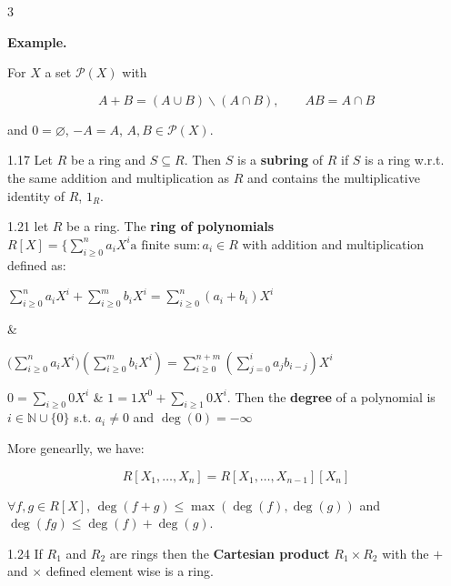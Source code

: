 \documentclass[8pt]{extarticle}
\newenvironment{example}{%
  \par\noindent
  \textbf{Example.}\ \normalfont
  \ignorespaces
}{%
  \par
}
\begin{document}
\begin{multicols}{3}
        \begin{example}
            For \(X\) a set \(\mathcal{P}(X)\) with
            
            \vspace{-15pt}
            \[A+B=(A\cup B)\backslash(A\cap B),\qquad AB=A\cap B\]
            \vspace{-15pt}

            and \(0=\varnothing\), \(-A=A\), \(A,B\in\mathcal{P}(X)\).
        \end{example}

        \begin{definition}{1.17}
            Let \(R\) be a ring and \(S\subseteq R\). Then \(S\) is a \textbf{subring} of \(R\) if \(S\) is a ring w.r.t. the same addition and multiplication as \(R\) and contains the multiplicative identity of \(R\), \(1_R\).
        \end{definition}

        \begin{definition}{1.21}
            let \(R\) be a ring. The \textbf{ring of polynomials} \(R[X]=\{\sum_{i\ge0}^na_iX^i\text{a finite sum}:a_i\in R\) with addition and multiplication defined as:
            
            \(\sum_{i\ge0}^na_iX^i+\sum_{i\ge0}^mb_iX^i=\sum_{i\ge0}^n(a_i+b_i)X^i\)
            
            \&
            
            \(\big(\sum\limits_{i\ge0}^na_iX^i)(\sum\limits_{i\ge0}^mb_iX^i)=\sum\limits_{i\ge0}^{n+m}(\sum\limits_{j=0}^ia_{j}b_{i-j})X^i\)
            
            \(0=\sum_{i\ge0}0X^i\) \& \(1=1X^0+\sum_{i\ge1}0X^i\). Then the \textbf{degree} of a polynomial is \(i\in\mathbb{N}\cup\{0\}\) s.t. \(a_i\ne0\) and \(\deg(0)=-\infty\)

            More genearlly, we have:
            
            \vspace{-10pt}
            \[R[X_1,\ldots,X_n]=R[X_1,\ldots,X_{n-1}][X_n]\]
            \vspace{-15pt}

            {\footnotesize \(\forall f,g\in R[X]\), \(\deg(f+g)\le\max(\deg(f),\deg(g))\)} and \(\deg(fg)\le\deg(f)+\deg(g)\).
        \end{definition}

        \begin{definition}{1.24}
            If \(R_1\) and \(R_2\) are rings then the \textbf{Cartesian product} \(R_1\times R_2\) with the \(+\) and \(\times\) defined element wise is a ring.
        \end{definition}


\end{multicols}
\end{document}
